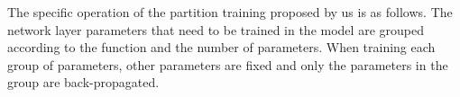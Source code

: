 The specific operation of the partition training proposed by us is as follows.
The network layer parameters that need to be trained in the model are grouped according to the function and the number of parameters.
When training each group of parameters,
    other parameters are fixed and only the parameters in the group are back-propagated.
 


